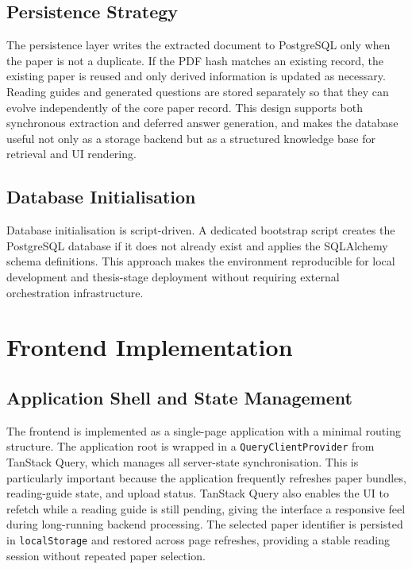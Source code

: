 \documentclass[12pt,a4paper]{report}
\begin{document}
\subsection{Persistence Strategy}

The persistence layer writes the extracted document to PostgreSQL only when the
paper is not a duplicate. If the PDF hash matches an existing record, the
existing paper is reused and only derived information is updated as necessary.
Reading guides and generated questions are stored separately so that they can
evolve independently of the core paper record. This design supports both
synchronous extraction and deferred answer generation, and makes the database
useful not only as a storage backend but as a structured knowledge base for
retrieval and UI rendering.

\subsection{Database Initialisation}

Database initialisation is script-driven. A dedicated bootstrap script creates
the PostgreSQL database if it does not already exist and applies the SQLAlchemy
schema definitions. This approach makes the environment reproducible for local
development and thesis-stage deployment without requiring external orchestration
infrastructure.

\section{Frontend Implementation}

\subsection{Application Shell and State Management}

The frontend is implemented as a single-page application with a minimal routing
structure. The application root is wrapped in a \texttt{QueryClientProvider}
from TanStack Query, which manages all server-state synchronisation. This is
particularly important because the application frequently refreshes paper
bundles, reading-guide state, and upload status. TanStack Query also enables the
UI to refetch while a reading guide is still pending, giving the interface a
responsive feel during long-running backend processing. The selected paper
identifier is persisted in \texttt{localStorage} and restored across page
refreshes, providing a stable reading session without repeated paper selection.
\end{document}
